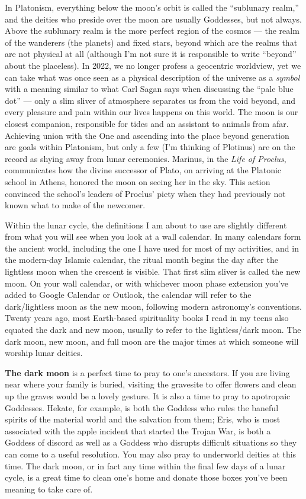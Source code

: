 \documentclass[
]{book}
\begin{document}
In Platonism, everything below the moon's orbit is called the ``sublunary realm,'' and the deities who preside over the moon are usually Goddesses, but not always. Above the sublunary realm is the more perfect region of the cosmos --- the realm of the wanderers (the planets) and fixed stars, beyond which are the realms that are not physical at all (although I'm not sure it is responsible to write ``beyond'' about the placeless). In 2022, we no longer profess a geocentric worldview, yet we can take what was once seen as a physical description of the universe as a \emph{symbol} with a meaning similar to what Carl Sagan says when discussing the ``pale blue dot'' --- only a slim sliver of atmosphere separates us from the void beyond, and every pleasure and pain within our lives happens on this world. The moon is our closest companion, responsible for tides and an assistant to animals from afar. Achieving union with the One and ascending into the place beyond generation are goals within Platonism, but only a few (I'm thinking of Plotinus) are on the record as shying away from lunar ceremonies. Marinus, in the \emph{Life of Proclus}, communicates how the divine successor of Plato, on arriving at the Platonic school in Athens, honored the moon on seeing her in the sky. This action convinced the school's leaders of Proclus' piety when they had previously not known what to make of the newcomer.

Within the lunar cycle, the definitions I am about to use are slightly different from what you will see when you look at a wall calendar. In many calendars form the ancient world, including the one I have used for most of my activities, and in the modern-day Islamic calendar, the ritual month begins the day after the lightless moon when the crescent is visible. That first slim sliver is called the new moon. On your wall calendar, or with whichever moon phase extension you've added to Google Calendar or Outlook, the calendar will refer to the dark/lightless moon as the new moon, following modern astronomy's conventions. Twenty years ago, most Earth-based spirituality books I read in my teens also equated the dark and new moon, usually to refer to the lightless/dark moon. The dark moon, new moon, and full moon are the major times at which someone will worship lunar deities.

\textbf{The dark moon} is a perfect time to pray to one's ancestors. If you are living near where your family is buried, visiting the gravesite to offer flowers and clean up the graves would be a lovely gesture. It is also a time to pray to apotropaic Goddesses. Hekate, for example, is both the Goddess who rules the baneful spirits of the material world and the salvation from them; Eris, who is most associated with the apple incident that started the Trojan War, is both a Goddess of discord as well as a Goddess who disrupts difficult situations so they can come to a useful resolution. You may also pray to underworld deities at this time. The dark moon, or in fact any time within the final few days of a lunar cycle, is a great time to clean one's home and donate those boxes you've been meaning to take care of.
\end{document}

